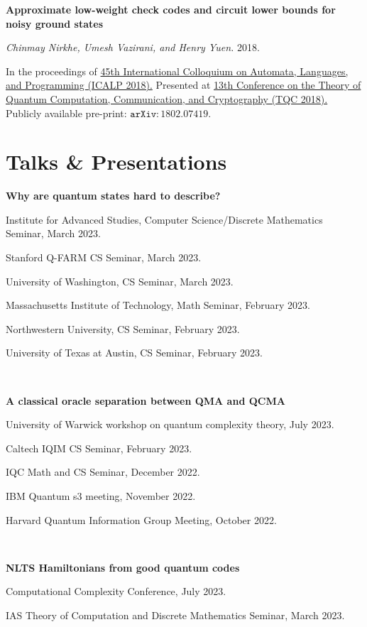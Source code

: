\documentclass[11pt]{article}
\begin{document}
\begin{enumerate}[{leftmargin=*,start=10,label=[\arabic*]\addtocounter{enumi}{-2}}]
\item \textbf{Approximate low-weight check codes and circuit lower bounds for noisy ground states}

\emph{Chinmay Nirkhe, Umesh Vazirani, and Henry Yuen.} 2018.

In the proceedings of \href{http://drops.dagstuhl.de/opus/volltexte/2018/9095/}{45th International Colloquium on Automata, Languages, and Programming (ICALP 2018).} 
Presented at \href{https://www.tqc2018.org/}{13th Conference on the Theory of Quantum Computation, Communication, and Cryptography (TQC 2018).}
Publicly available pre-print: \href{https://arxiv.org/abs/1802.07419}{$\mathtt{arXiv:1802.07419}$}.

\end{enumerate}


\section{Talks \& Presentations}

\textbf{Why are quantum states hard to describe?}

Institute for Advanced Studies, Computer Science/Discrete Mathematics Seminar, March 2023.

Stanford Q-FARM CS Seminar, March 2023.

University of Washington, CS Seminar, March 2023.

Massachusetts Institute of Technology, Math Seminar, February 2023.

Northwestern University, CS Seminar, February 2023.

University of Texas at Austin, CS Seminar, February 2023.

\

\textbf{A classical oracle separation between QMA and QCMA}

University of Warwick workshop on quantum complexity theory, July 2023.

Caltech IQIM CS Seminar, February 2023.

IQC Math and CS Seminar, December 2022.

IBM Quantum s3 meeting, November 2022.

Harvard Quantum Information Group Meeting, October 2022.

\

\textbf{NLTS Hamiltonians from good quantum codes}

Computational Complexity Conference, July 2023.

IAS Theory of Computation and Discrete Mathematics Seminar, March 2023.
\end{document}
